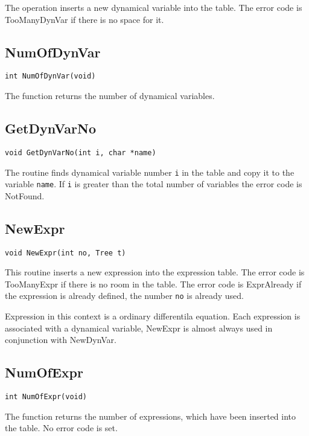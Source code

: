 The operation inserts a new dynamical variable into the table. The
error code is TooManyDynVar if there is no space for it.

\subsection{NumOfDynVar}
\begin{verbatim}
int NumOfDynVar(void)
\end{verbatim}

The function returns the number of dynamical variables.

\subsection{GetDynVarNo}
\begin{verbatim}
void GetDynVarNo(int i, char *name)
\end{verbatim}

The routine finds dynamical variable number {\tt i} in the table and
copy it to the variable {\tt name}.
If {\tt i} is greater than the total number of variables the error
code is NotFound.

\subsection{NewExpr}
\begin{verbatim}
void NewExpr(int no, Tree t)
\end{verbatim}

This routine inserts a new expression into the expression table. The error
code is TooManyExpr if there is no room in the table. The error code is
ExprAlready if the expression is already defined, \ie the number {\tt no}
is already used.

Expression in this context is a ordinary differentila equation. Each
expression is associated with a dynamical variable, \ie NewExpr is
almost always used in conjunction with NewDynVar.

\subsection{NumOfExpr}
\begin{verbatim}
int NumOfExpr(void)
\end{verbatim}

The function returns the number of expressions, which have been inserted
into the table. No error code is set.

